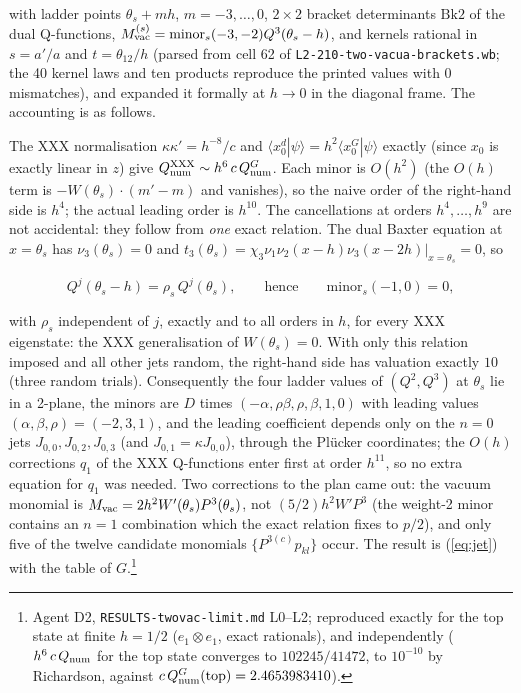 \documentclass[11pt]{article}
\begin{document}
with ladder points $\theta_s+mh$, $m=-3,\dots,0$, $2\times2$ bracket determinants $\mathrm{Bk2}$ of the dual Q-functions, $M^{(s)}_{\rm vac}=\mathrm{minor}_s(-3,-2)Q^3(\theta_s-h)$, and kernels rational in $s=a'/a$ and $t=\theta_{12}/h$ (parsed from cell 62 of \texttt{L2-\allowbreak{}210-\allowbreak{}two-\allowbreak{}vacua-\allowbreak{}brackets.\allowbreak{}wb}; the 40 kernel laws and ten products reproduce the printed values with 0 mismatches), and expanded it formally at $h\to0$ in the diagonal frame.
The accounting is as follows.

The XXX normalisation $\kappa\kappa'=h^{-8}/c$ and $\langle x_0^d|\psi\rangle=h^2\langle x_0^G|\psi\rangle$ exactly (since $x_0$ is exactly linear in $z$) give $Q_{\rm num}^{\rm XXX}\sim h^6\,c\,Q_{\rm num}^G$. Each minor is $O(h^2)$ (the $O(h)$ term is $-W(\theta_s)\cdot(m'-m)$ and vanishes), so the naive order of the right-hand side is $h^4$; the actual leading order is $h^{10}$. The cancellations at orders $h^4,\dots,h^9$ are not accidental: they follow from \emph{one} exact relation.
The dual Baxter equation at $x=\theta_s$ has $\nu_3(\theta_s)=0$ and $t_3(\theta_s)=\chi_3\nu_1\nu_2(x-h)\nu_3(x-2h)|_{x=\theta_s}=0$, so

\begin{equation}
Q^j(\theta_s-h)=\rho_s\,Q^j(\theta_s),\qquad\text{hence}\qquad\mathrm{minor}_s(-1,0)=0,\label{eq:minor10}
\end{equation}

with $\rho_s$ independent of $j$, exactly and to all orders in $h$, for every XXX eigenstate: the XXX generalisation of $W(\theta_s)=0$. With only this relation imposed and all other jets random, the right-hand side has valuation exactly $10$ (three random trials).
Consequently the four ladder values of $(Q^2,Q^3)$ at $\theta_s$ lie in a 2-plane, the minors are $D$ times $(-\alpha,\rho\beta,\rho,\beta,1,0)$ with leading values $(\alpha,\beta,\rho)=(-2,3,1)$, and the leading coefficient depends only on the $n=0$ jets $J_{0,0},J_{0,2},J_{0,3}$ (and $J_{0,1}=\kappa J_{0,0}$), through the Plücker coordinates; the $O(h)$ corrections $q_1$ of the XXX Q-functions enter first at order $h^{11}$, so no extra equation for $q_1$ was needed.
Two corrections to the plan came out: the vacuum monomial is $M_{\rm vac}=2h^2W'(\theta_s)P^3(\theta_s)$, not $(5/2)h^2W'P^3$ (the weight-2 minor contains an $n=1$ combination which the exact relation fixes to $p/2$), and only five of the twelve candidate monomials $\{P^{3(c)}p_{kl}\}$ occur.
The result is (\ref{eq:jet}) with the table of $G$.\footnote{Agent D2, \texttt{RESULTS-\allowbreak{}twovac-\allowbreak{}limit.\allowbreak{}md} L0--L2; reproduced exactly for the top state at finite $h=1/2$ ($e_1\otimes e_1$, exact rationals), and independently ($h^6\,c\,Q_{\rm num}$ for the top state converges to $102245/41472$, to $10^{-10}$ by Richardson, against $c\,Q_{\rm num}^G(\mathrm{top})=2.4653983410$).}
\end{document}
